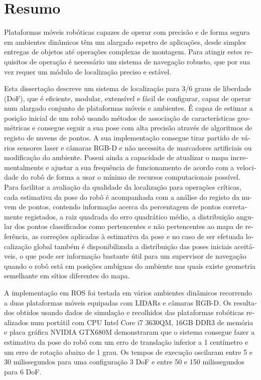\chapter*{Resumo}

\begin{otherlanguage}{portuguese}

Plataformas móveis robóticas capazes de operar com precisão e de forma segura em ambientes dinâmicos têm um alargado espetro de aplicações, desde simples entregas de objetos até operações complexas de montagem. Para atingir estes requisitos de operação é necessário um sistema de navegação robusto, que por sua vez requer um módulo de localização preciso e estável.

Esta dissertação descreve um sistema de localização para 3/6 graus de liberdade (DoF), que é eficiente, modular, extensível e fácil de configurar, capaz de operar num alargado conjunto de plataformas móveis e ambientes. É capaz de estimar a posição inicial de um robô usando métodos de associação de características geométricas e consegue seguir a sua pose com alta precisão através de algoritmos de registo de nuvens de pontos. A sua implementação consegue tirar partido de vários sensores laser e câmaras RGB-D e não necessita de marcadores artificiais ou modificação do ambiente. Possui ainda a capacidade de atualizar o mapa incrementalmente e ajustar a sua frequência de funcionamento de acordo com a velocidade do robô de forma a usar o mínimo de recursos computacionais possível. Para facilitar a avaliação da qualidade da localização para operações críticas, cada estimativa da pose do robô é acompanhada com a análise do registo da nuvem de pontos, contendo informação acerca da percentagem de pontos corretamente registados, a raiz quadrada do erro quadrático médio, a distribuição angular dos pontos classificados como pertencentes e não pertencentes ao mapa de referência, as correções aplicadas à estimativa da pose e no caso de ser efetuada localização global também é disponibilizada a distribuição das poses iniciais aceitáveis, o que pode ser informação bastante útil para um supervisor de navegação quando o robô está em posições ambíguas do ambiente nas quais existe geometria semelhante em sítios diferentes do mapa.

A implementação em ROS foi testada em vários ambientes dinâmicos recorrendo a duas plataformas móveis equipadas com LIDARs e câmaras RGB-D. Os resultados obtidos usando dados de simulação e recolhidos das plataformas robóticas realizados num portátil com CPU Intel Core i7 3630QM, 16GB DDR3 de memória e placa gráfica NVIDIA GTX680M demonstraram que o sistema consegue fazer a estimativa da pose do robô com um erro de translação inferior a 1 centímetro e um erro de rotação abaixo de 1 grau. Os tempos de execução oscilaram entre 5 e 30 milissegundos para uma configuração 3 DoF e entre 50 e 150 milissegundos para 6 DoF.


\end{otherlanguage}
